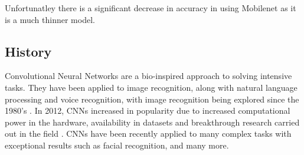 Unfortunatley there is a significant decrease in accuracy in using Mobilenet as it is a much thinner model.

\subsection*{History}
Convolutional Neural Networks are a bio-inspired approach to solving intensive tasks.
They have been applied to image recognition, along with natural language processing and voice recognition, with image recognition being explored since the 1980's \parencite{handsOnML}.
In 2012, CNNs increased in popularity due to increased computational power in the hardware, availability in datasets and breakthrough research carried out in the field \parencite{krizhevsky2012imagenet}.
CNNs have been recently applied to many complex tasks with exceptional results such as facial recognition, and many more.